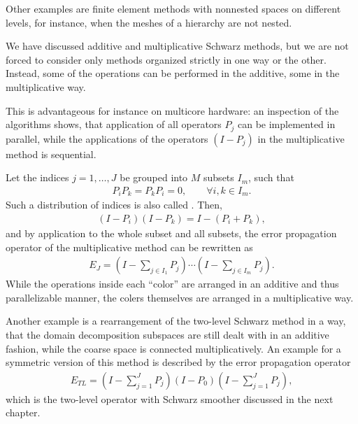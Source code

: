 \begin{example}
  Other examples are finite element methods with nonnested spaces on
  different levels, for instance, when the meshes of a hierarchy are
  not nested.
\end{example}

\begin{remark}
  We have discussed additive and multiplicative Schwarz methods, but
  we are not forced to consider only methods organized strictly in one
  way or the other. Instead, some of the operations can be performed
  in the additive, some in the multiplicative way.
  
  This is advantageous for instance on multicore hardware: an
  inspection of the algorithms shows, that application of all
  operators $P_j$ can be implemented in parallel, while the
  applications of the operators $(I-P_j)$ in the multiplicative method
  is sequential.
\end{remark}

\begin{example}
  Let the indices $j=1,\dots,J$ be grouped into $M$ subsets $I_m$,
  such that
  \begin{gather*}
    P_iP_k = P_k P_i = 0,\qquad \forall i,k\in I_m.
  \end{gather*}
  Such a distribution of indices is also called
  . Then,
  \begin{gather*}
    (I-P_i)(I-P_k) = I- (P_i+P_k),
  \end{gather*}
  and by application to the whole subset and all subsets, the error
  propagation operator of the multiplicative method can be rewritten
  as
  \begin{gather*}
    E_J = \left(I-\sum_{j\in I_1} P_j \right)
    \cdots
    \left(I-\sum_{j\in I_m} P_j \right).
  \end{gather*}
  While the operations inside each ``color'' are arranged in an
  additive and thus parallelizable manner, the colers themselves are
  arranged in a multiplicative way.
\end{example}

\begin{example}
  Another example is a rearrangement of the two-level Schwarz method
  in a way, that the domain decomposition subspaces are still dealt
  with in an additive fashion, while the coarse space is connected
  multiplicatively. An example for a symmetric version of this method
  is described by the error propagation operator
  \begin{gather}
    \label{eq:schwarz:51}
    E_{TL} = \left(I-\sum_{j=1}^J P_j \right) (I-P_0)
    \left(I-\sum_{j=1}^J P_j \right),
  \end{gather}
  which is the two-level operator with Schwarz smoother discussed in
  the next chapter.
\end{example}

